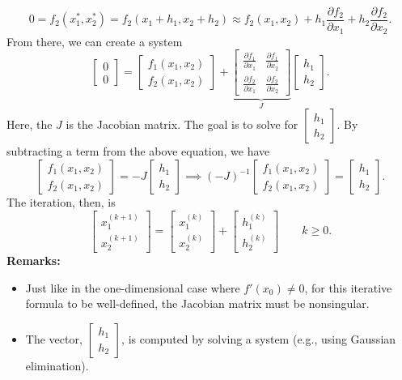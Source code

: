 \documentclass[letterpaper]{article}
\begin{document}
\[0 = f_{2}(x_1^*, x_2^*) = f_{2}(x_1 + h_1, x_2 + h_2) \approx f_{2}(x_1, x_2) + h_1 \frac{\partial f_2}{\partial x_1} + h_2 \frac{\partial f_2}{\partial x_2}.\]
From there, we can create a system 
\[\begin{bmatrix}
    0 \\ 0
\end{bmatrix} = \begin{bmatrix}
    f_{1}(x_1, x_2) \\ 
    f_{2}(x_1, x_2)
\end{bmatrix} + \underbrace{\begin{bmatrix}
    \frac{\partial f_1}{\partial x_1} & \frac{\partial f_1}{\partial x_2} \\ 
    \frac{\partial f_2}{\partial x_1} & \frac{\partial f_2}{\partial x_2}
\end{bmatrix}}_{J} \begin{bmatrix}
    h_1 \\ h_2
\end{bmatrix}.\]
Here, the $J$ is the Jacobian matrix. The goal is to solve for $\begin{bmatrix}
    h_1 \\ h_2
\end{bmatrix}$. By subtracting a term from the above equation, we have 
\[\begin{bmatrix}
    f_{1}(x_1, x_2) \\ 
    f_{2}(x_1, x_2)
\end{bmatrix} = -J\begin{bmatrix}
    h_1 \\ h_2
\end{bmatrix} \implies (-J)^{-1}\begin{bmatrix}
    f_{1}(x_1, x_2) \\ 
    f_{2}(x_1, x_2)
\end{bmatrix} = \begin{bmatrix}
    h_1 \\ h_2
\end{bmatrix}.\]
The iteration, then, is 
\[\begin{bmatrix}
    x_{1}^{(k + 1)} \\ 
    x_{2}^{(k + 1)}
\end{bmatrix} = \begin{bmatrix}
    x_{1}^{(k)} \\ 
    x_{2}^{(k)}
\end{bmatrix} + \begin{bmatrix}
    h_1^{(k)} \\ 
    h_2^{(k)}
\end{bmatrix} \qquad k \geq 0.\]
\textbf{Remarks:}
\begin{itemize}
    \item Just like in the one-dimensional case where $f'(x_0) \neq 0$, for this iterative formula to be well-defined, the Jacobian matrix must be nonsingular.
    \item The vector, $\begin{bmatrix}
        h_1 \\ h_2
    \end{bmatrix}$, is computed by solving a system (e.g., using Gaussian elimination).
\end{itemize}
\end{document}
